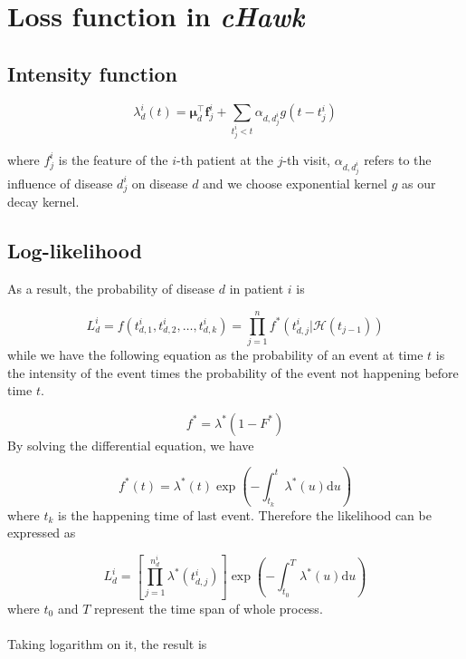\documentclass{article}
\begin{document}
	\section{Loss function in \textit{cHawk}}

		\subsection{Intensity function}

		\begin{equation}
			\lambda_{d}^{i}(t)=\boldsymbol{\mu}_{d}^{\top} \boldsymbol{f}_{j}^{i}+\sum_{t_{j}^{i}<t} \alpha_{d, d_{j}^{i}} g\left(t-t_{j}^{i}\right)
		\end{equation}
		
		where $f^i_j$ is the feature of the $i$-th patient at the $j$-th visit, $\alpha_{d, d_{j}^{i}}$ refers to the influence of disease $d_{j}^{i}$ on disease $d$ and we choose exponential kernel $g$ as our decay kernel.
		
		\subsection{Log-likelihood}
		
		As a result, the probability of disease $d$ in patient $i$ is
		
		\begin{equation}
			L^i_d = f\left(t^i_{d,1}, t^i_{d,2}, \ldots, t^i_{d,k}\right)=\prod_{j=1}^{n} f^{*}\left(t^i_{d,j} | \mathcal{H}\left(t_{j-1}\right)\right)
		\end{equation}
		while we have the following equation as the probability of an event at time $t$ is the intensity of the event times the probability of the event not happening before time $t$.
		
		\begin{equation}
			f^{*} = \lambda^{*} (1 - F^*)
		\end{equation}
		By solving the differential equation, we have
		
		\begin{equation}
			f^{*}(t)=\lambda^{*}(t) \exp \left(-\int_{t_{k}}^{t} \lambda^{*}(u) \mathrm{d} u\right)
		\end{equation}
		where $t_k$ is the happening time of last event. Therefore the likelihood can be expressed as
		
		\begin{equation}
			L^i_d = \left[\prod_{j=1}^{n^i_d} \lambda^{*}\left(t^i_{d, j}\right)\right] \exp \left(-\int_{t_0}^{T} \lambda^{*}(u) \mathrm{d} u\right)
		\end{equation}
		where $t_0$ and $T$ represent the time span of whole process.
		\\\\
		Taking logarithm on it, the result is
		
\end{document}
